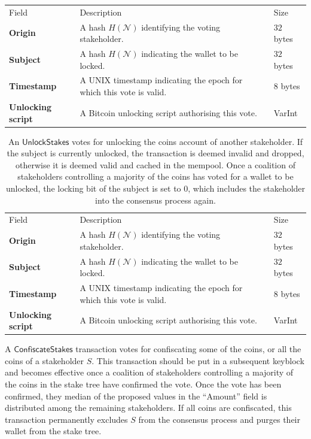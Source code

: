 \documentclass{style/kththesis}
\begin{document}
\begin{appendices}
\begin{table}[ht]
\label{tab:lock}
\begin{tabularx}{\textwidth}{lXl}
\cmidrule(r){1-3}
Field & Description & Size \\ 
\cmidrule(r){1-3}
\textbf{Origin} & A hash $H(\mathcal{N})$ identifying the voting stakeholder. & $32$ bytes \\
\textbf{Subject} & A hash $H(\mathcal{N})$ indicating the wallet to be locked. & $32$ bytes \\
\textbf{Timestamp} & A UNIX timestamp indicating the epoch for which this vote is valid. & $8$ bytes \\
\textbf{Unlocking script} & A Bitcoin unlocking script authorising this vote. & VarInt \\
\end{tabularx}
\end{table}
\begin{table}[ht]
\caption{An $\mathsf{UnlockStakes}$ votes for unlocking the coins account of another stakeholder. If the subject is currently unlocked, the transaction is deemed invalid and dropped, otherwise it is deemed valid and cached in the mempool. Once a coalition of stakeholders controlling a majority of the coins has voted for a wallet to be unlocked, the locking bit of the subject is set to 0, which includes the stakeholder into the consensus process again.}
\label{tab:unlock}
\begin{tabularx}{\textwidth}{lXl}
\cmidrule(r){1-3}
Field & Description & Size \\ 
\cmidrule(r){1-3}
\textbf{Origin} & A hash $H(\mathcal{N})$ identifying the voting stakeholder. & $32$ bytes \\
\textbf{Subject} & A hash $H(\mathcal{N})$ indicating the wallet to be locked. & $32$ bytes \\
\textbf{Timestamp} & A UNIX timestamp indicating the epoch for which this vote is valid. & $8$ bytes \\
\textbf{Unlocking script} & A Bitcoin unlocking script authorising this vote. & VarInt \\
\end{tabularx}
\end{table}
\begin{table}[ht]
\caption{A  $\mathsf{ConfiscateStakes}$ transaction votes for confiscating some of the coins, or all the coins of a stakeholder $S$. This transaction should be put in a subsequent keyblock and becomes effective once a coalition of stakeholders controlling a majority of the coins in the stake tree have confirmed the vote. Once the vote has been confirmed, they median of the proposed values in the ``Amount'' field is distributed among the remaining stakeholders. If all coins are confiscated, this transaction permanently excludes $S$ from the consensus process and purges their wallet from the stake tree.}

\end{table}
\end{appendices}
\end{document}
